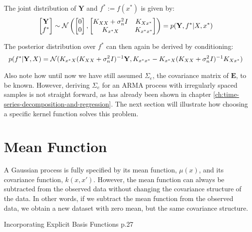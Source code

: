 The joint distribution of $\mathbf{Y}$ and $f^{\ast} := f(x^{\ast})$ is given by:
\begin{gather}
    \begin{bmatrix}
        \mathbf{Y} \\
        f^{\ast}
    \end{bmatrix}
    \sim \operatorname{\mathcal{N}} \left(
        \begin{bmatrix}
        0 \\
        0
        \end{bmatrix},
        \begin{bmatrix}
        K_{XX} + \sigma_n^2 I & K_{Xx^{\ast}} \\
        K_{x^{\ast}X} & K_{x^{\ast}x^{\ast}}
        \end{bmatrix}
        \right)
    = p(\mathbf{Y}, f^{\ast}| X, x^{\ast})
\end{gather}


The posterior distribution over $f^{\ast}$ can then again be derived by conditioning:
\begin{gather}\label{eq:posterior-gp}
    p(f^{\ast}| \mathbf{Y}, X) = \operatorname{\mathcal{N}}(
K_{x^{\ast}X} (K_{XX} + \sigma_n^2 I)^{-1} \mathbf{Y},
K_{x^{\ast}x^{\ast}} - K_{x^{\ast}X}(K_{XX} + \sigma_n^2 I)^{-1}K_{Xx^{\ast}})
\end{gather}


Also note how until now we have still assumed $\Sigma_e$, the covariance matrix of $\mathbf{E}$, to be known.
However, deriving $\Sigma_e$ for an ARMA process with irregularly spaced samples is not straight forward, as has already
been shown in chapter \ref{ch:time-series-decomposition-and-regression}.
The next section will illustrate how choosing a specific kernel function solves this problem.

\section{Mean Function}\label{subsec:mean-function}


A Gaussian process is fully specified by its mean function, $\mu(x)$, and its covariance
function, $k(x, x')$.
However, the mean function can always be subtracted from the observed data without changing
the covariance structure of the data. In other words, if we subtract the mean function from the
observed data, we obtain a new dataset with zero mean, but the same covariance structure.


Incorporating Explicit Basis Functions \citeauthor{rasmussen_gaussian_2006} p.27


